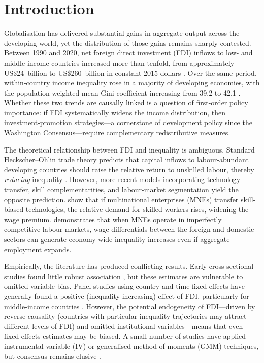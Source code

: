 \documentclass[12pt,a4paper]{article}
\begin{document}
\section{Introduction}\label{sec:intro}

Globalisation has delivered substantial gains in aggregate output across the developing world, yet the distribution of those gains remains sharply contested.  Between 1990 and 2020, net foreign direct investment (FDI) inflows to low- and middle-income countries increased more than tenfold, from approximately US\$24~billion to US\$260~billion in constant 2015 dollars \citep{UNCTAD2021}.  Over the same period, within-country income inequality rose in a majority of developing economies, with the population-weighted mean Gini coefficient increasing from 39.2 to 42.1 \citep{Solt2020}.  Whether these two trends are causally linked is a question of first-order policy importance: if FDI systematically widens the income distribution, then investment-promotion strategies---a cornerstone of development policy since the Washington Consensus---require complementary redistributive measures.

The theoretical relationship between FDI and inequality is ambiguous.  Standard Heckscher--Ohlin trade theory predicts that capital inflows to labour-abundant developing countries should raise the relative return to unskilled labour, thereby \textit{reducing} inequality \citep{Stolper1941}.  However, more recent models incorporating technology transfer, skill complementarities, and labour-market segmentation yield the opposite prediction.  \citet{Feenstra1996} show that if multinational enterprises (MNEs) transfer skill-biased technologies, the relative demand for skilled workers rises, widening the wage premium.  \citet{Markusen2001} demonstrates that when MNEs operate in imperfectly competitive labour markets, wage differentials between the foreign and domestic sectors can generate economy-wide inequality increases even if aggregate employment expands.

Empirically, the literature has produced conflicting results.  Early cross-sectional studies found little robust association \citep{Tsai1995, Alderson1999}, but these estimates are vulnerable to omitted-variable bias.  Panel studies using country and time fixed effects have generally found a positive (inequality-increasing) effect of FDI, particularly for middle-income countries \citep{Figini2011, Herzer2012}.  However, the potential endogeneity of FDI---driven by reverse causality (countries with particular inequality trajectories may attract different levels of FDI) and omitted institutional variables---means that even fixed-effects estimates may be biased.  A small number of studies have applied instrumental-variable (IV) or generalised method of moments (GMM) techniques, but consensus remains elusive \citep{Jaumotte2013, Bogliaccini2009}.
\end{document}
